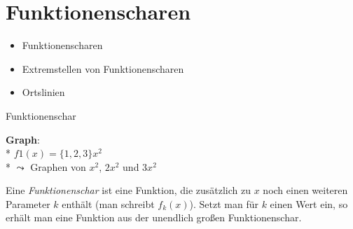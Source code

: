 \chapter{Funktionenscharen}
\begin{inhalt}
  \begin{itemize}
    \item Funktionenscharen
    \item Extremstellen von Funktionenscharen
    \item Ortslinien
  \end{itemize}
\end{inhalt}

\begin{bla}{Funktionenschar}
  \begin{marginfigure}[4em]
    \begin{tcolorbox}[colback=white!95!black,colframe=white!75!black,title=CAS:,arc=0mm]
      \begin{scriptsize}
        \textbf{Graph}: \\*
        \hfill \( f1(x) = \{ 1, 2, 3 \}x^2 \) \\*
        \( \leadsto \) Graphen von \( x^2 \), \( 2x^2 \) und \( 3x^2 \)
      \end{scriptsize}
    \end{tcolorbox}
  \end{marginfigure}
  Eine \emph{Funktionenschar} ist eine Funktion, die zusätzlich zu $x$ noch einen weiteren Parameter $k$ enthält (man schreibt $f_k(x)$). Setzt man für $k$ einen Wert ein, so erhält man eine Funktion aus der unendlich großen Funktionenschar.
\end{bla}

